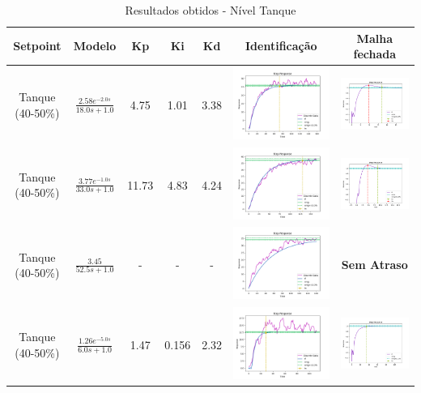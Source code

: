 \begin{table}[H]
    \caption{Resultados obtidos - Nível Tanque}
    \centering
    \begin{tabular}{|c|c|c|c|c|c|c|}
        \hline
        \textbf{Setpoint} & \textbf{Modelo}                      & \textbf{Kp} & \textbf{Ki} & \textbf{Kd} & \textbf{Identificação} & \textbf{Malha fechada} \\
        \hline
        Tanque (40-50\%)  & $\frac{2.58 e^{-2.0s}}{18.0s + 1.0}$ & 4.75        & 1.01        & 3.38        & \includegraphics[width=0.2\linewidth]{figuras/tanque_40_50} & \includegraphics[width=0.2\linewidth]{figuras/tanque_40_50c} \\
        \hline
        Tanque (40-50\%)  & $\frac{3.77 e^{-1.0s}}{33.0s + 1.0}$ & 11.73       & 4.83        & 4.24        & \includegraphics[width=0.2\linewidth]{figuras/tanque_50_60} & \includegraphics[width=0.2\linewidth]{figuras/tanque_50_60c} \\
        \hline
        Tanque (40-50\%)  & $\frac{3.45}{52.5s + 1.0}$           & -           & -           & -           & \includegraphics[width=0.2\linewidth]{figuras/tanque_60_70} & \textbf{Sem Atraso} \\
        \hline
        Tanque (40-50\%)  & $\frac{1.26 e^{-5.0s}}{6.0s + 1.0}$  & 1.47        & 0.156       & 2.32        & \includegraphics[width=0.2\linewidth]{figuras/tanque_70_80} & \includegraphics[width=0.2\linewidth]{figuras/tanque_70_80c} \\

\end{tabular}
\end{table}
